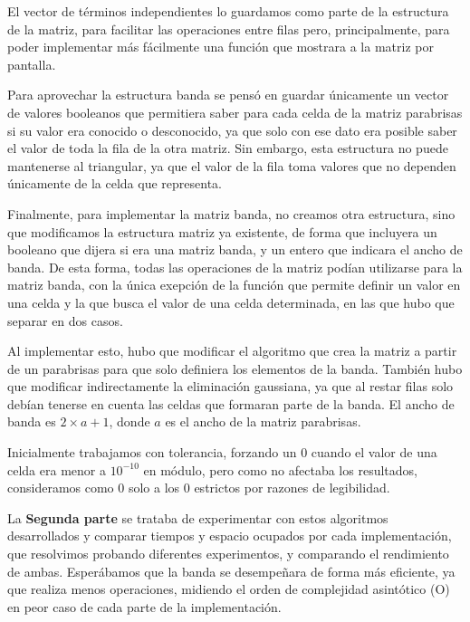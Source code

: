 \documentclass[spanish,a4paper]{article}
\begin{document}
El vector de términos independientes lo guardamos como parte de la estructura de la matriz, para facilitar las operaciones entre filas pero, principalmente, para poder implementar más fácilmente una función que mostrara a la matriz por pantalla.

Para aprovechar la estructura banda se pensó en guardar únicamente un vector de valores booleanos que permitiera saber para cada celda de la matriz parabrisas si su valor era conocido o desconocido, ya que solo con ese dato era posible saber el valor de toda la fila de la otra matriz. Sin embargo, esta estructura no puede mantenerse al triangular, ya que el valor de la fila toma valores que no dependen únicamente de la celda que representa. 

Finalmente, para implementar la matriz banda, no creamos otra estructura, sino que modificamos la estructura matriz ya existente, de forma que incluyera un booleano que dijera si era una matriz banda, y un entero que indicara el ancho de banda. De esta forma, todas las operaciones de la matriz podían utilizarse para la matriz banda, con la única exepción de la función que permite definir un valor en una celda y la que busca el valor de una celda determinada, en las que hubo que separar en dos casos.

Al implementar esto, hubo que modificar el algoritmo que crea la matriz a partir de un parabrisas para que solo definiera los elementos de la banda. También hubo que modificar indirectamente la eliminación gaussiana, ya que al restar filas solo debían tenerse en cuenta las celdas que formaran parte de la banda. El ancho de banda es $2 \times a + 1$, donde $a$ es el ancho de la matriz parabrisas.

Inicialmente trabajamos con tolerancia, forzando un 0 cuando el valor de una celda era menor a $10^{-10}$ en módulo, pero como no afectaba los resultados, consideramos como 0 solo a los 0 estrictos por razones de legibilidad.

La \textbf{Segunda parte} se trataba de experimentar con estos algoritmos desarrollados y comparar tiempos y espacio ocupados por cada implementación, que resolvimos probando diferentes experimentos, y comparando el rendimiento de ambas. Esperábamos que la banda se desempeñara de forma más eficiente, ya que realiza menos operaciones, midiendo el orden de complejidad asintótico (O) en peor caso de cada parte de la implementación. \newline 
 
\end{document}
